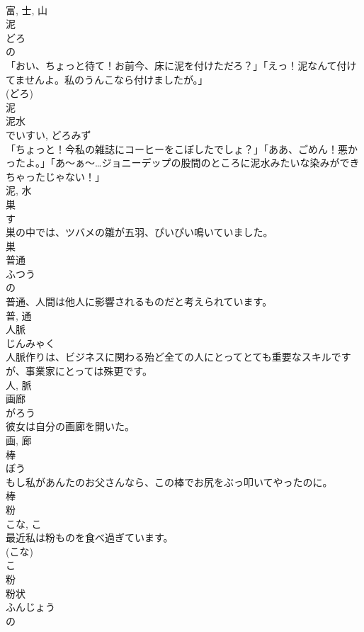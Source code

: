 \documentclass[8pt]{extreport}
\begin{document}
\begin{CJK}{UTF8}{min}
\\	富, 士, 山	
\\	泥	
\\	どろ	
\\	の 
\\	「おい、ちょっと待て！お前今、床に泥を付けただろ？」「えっ！泥なんて付けてませんよ。私のうんこなら付けましたが。」	
\\	(どろ) 
\\	泥	
\\	泥水	
\\	でいすい, どろみず	
\\	「ちょっと！今私の雑誌にコーヒーをこぼしたでしょ？」「ああ、ごめん！悪かったよ。」「あ〜ぁ〜…ジョニーデップの股間のところに泥水みたいな染みができちゃったじゃない！」	
\\	泥, 水	
\\	巣	
\\	す	
\\	巣の中では、ツバメの雛が五羽、ぴいぴい鳴いていました。	
\\	巣	
\\	普通	
\\	ふつう	
\\	の 
\\	普通、人間は他人に影響されるものだと考えられています。	
\\	普, 通	
\\	人脈	
\\	じんみゃく	
\\	人脈作りは、ビジネスに関わる殆ど全ての人にとってとても重要なスキルですが、事業家にとっては殊更です。	
\\	人, 脈	
\\	画廊	
\\	がろう	
\\	彼女は自分の画廊を開いた。	
\\	画, 廊	
\\	棒	
\\	ぼう	
\\	もし私があんたのお父さんなら、この棒でお尻をぶっ叩いてやったのに。	
\\	棒	
\\	粉	
\\	こな, こ	
\\	最近私は粉ものを食べ過ぎています。	
\\	(こな) 
\\	こ 
\\	粉	
\\	粉状	
\\	ふんじょう	
\\	の 

\end{CJK}
\end{document}

